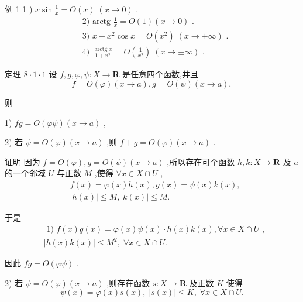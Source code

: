 例 1 1 ) $x\sin \frac{1}{x} = O\left( x\right) \;\left( {x \rightarrow  0}\right)$ .
\begin{align*}
	&\text{ 2) arctg }\frac{1}{x} = O\left( 1\right) \left( {x \rightarrow  0}\right) \text{ . }\\
	&\text{ 3) }x + {x}^{2}\cos x = O\left( {x}^{2}\right) \;\left( {x \rightarrow   \pm  \infty }\right) \text{ . }\\
	&\text{ 4) }\frac{\operatorname{arctg}x}{1 + {x}^{2}} = O\left( \frac{1}{{x}^{2}}\right) \;\left( {x \rightarrow   \pm  \infty }\right) \text{ . }
\end{align*}

定理 $8 \cdot  1 \cdot  1$ 设 $f,g,\varphi ,\psi  : X \rightarrow  \mathbf{R}$ 是任意四个函数,并且
$$f = O\left( \varphi \right) \left( {x \rightarrow  a}\right) ,g = O\left( \psi \right) \left( {x \rightarrow  a}\right) ,$$

则

1) ${fg} = O\left( {\varphi \psi }\right) \left( {x \rightarrow  a}\right)$ ,

2) 若 $\psi  = O\left( \varphi \right) \left( {x \rightarrow  a}\right)$ ,则 $f + g = O\left( \varphi \right) \left( {x \rightarrow  a}\right)$ .

证明 因为 $f = O\left( \varphi \right) ,g = O\left( \psi \right) \left( {x \rightarrow  a}\right)$ ,所以存在可个函数 $h,k : X \rightarrow  \mathbf{R}$ 及 $a$ 的一个邻域 $U$ 与正数 $M$ ,使得 $\forall x \in  X \cap  U$ ,
\begin{align*}
	&f\left( x\right)  = \varphi \left( x\right) h\left( x\right) ,g\left( x\right)  = \psi \left( x\right) k\left( x\right) ,\\
	&\left| {h\left( x\right) }\right|  \leq  M,\left| {k\left( x\right) }\right|  \leq  M.
\end{align*}

于是
\begin{align*}
	&\text{ 1) }f\left( x\right) g\left( x\right)  = \varphi \left( x\right) \psi \left( x\right)  \cdot  h\left( x\right) k\left( x\right) ,\forall x \in  X \cap  U\text{ , }\\
	&\left| {h\left( x\right) k\left( x\right) }\right|  \leq  {M}^{2},\;\forall x \in  X \cap  U.
\end{align*}

因此 ${fg} = O\left( {\varphi \psi }\right)$ .

2) 若 $\psi  = O\left( \varphi \right) \left( {x \rightarrow  a}\right)$ ,则存在函数 $s : X \rightarrow  \mathbf{R}$ 及正数 $K$ 使得
$$\psi \left( x\right)  = \varphi \left( x\right) s\left( x\right) ,\;\left| {s\left( x\right) }\right|  \leq  K,\;\forall x \in  X \cap  U.$$

